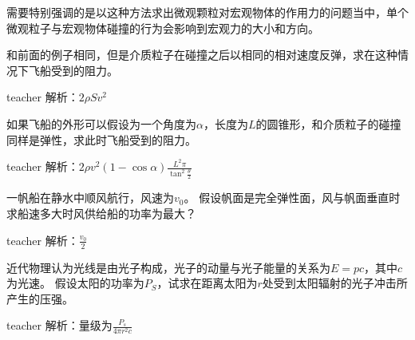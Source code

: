 需要特别强调的是以这种方法求出微观颗粒对宏观物体的作用力的问题当中，单个微观粒子与宏观物体碰撞的行为会影响到宏观力的大小和方向。



\begin{example}
和前面的例子相同，但是介质粒子在碰撞之后以相同的相对速度反弹，求在这种情况下飞船受到的阻力。
\begin{taggedblock}{teacher}
\newline
解析：$2 \rho S v^2$
\end{taggedblock}
\end{example}

\begin{example}
如果飞船的外形可以假设为一个角度为$\alpha$，长度为$L$的圆锥形，和介质粒子的碰撞同样是弹性，求此时飞船受到的阻力。
\begin{taggedblock}{teacher}
\newline
解析：$2 \rho v^2(1-\cos\alpha)\frac{L^2\pi}{\tan^2\frac{\theta}{2}}$
\end{taggedblock}
\end{example}


\begin{example}
一帆船在静水中顺风航行，风速为$v_0$。
假设帆面是完全弹性面，风与帆面垂直时求船速多大时风供给船的功率为最大？

\begin{taggedblock}{teacher}
\noindent
解析：$\frac{v_0}{2}$
\end{taggedblock}
\end{example}

\begin{example}
近代物理认为光线是由光子构成，光子的动量与光子能量的关系为$E = pc$，其中$c$为光速。
假设太阳的功率为$P_S$，试求在距离太阳为$r$处受到太阳辐射的光子冲击所产生的压强。
\begin{taggedblock}{teacher}
\newline
解析：量级为$\frac{P_s}{4\pi r^2c}$
\end{taggedblock}
\end{example}




